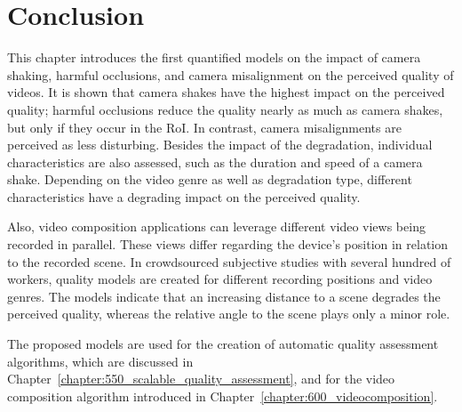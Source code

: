 \section{Conclusion}
\label{sec_499_conclusion}
This chapter introduces the first quantified models on the impact of camera shaking, harmful occlusions, and camera misalignment on the perceived quality of videos. 
It is shown that camera shakes have the highest impact on the perceived quality; harmful occlusions reduce the quality nearly as much as camera shakes, but only if they occur in the \ac{RoI}. 
In contrast, camera misalignments are perceived as less disturbing. 
Besides the impact of the degradation, individual characteristics are also assessed, such as the duration and speed of a camera shake.
Depending on the video genre as well as degradation type, different characteristics have a degrading impact on the perceived quality.

Also, video composition applications can leverage different video views being recorded in parallel.
These views differ regarding the device's position in relation to the recorded scene.
In crowdsourced subjective studies with several hundred of workers, quality models are created for different recording positions and video genres.
The models indicate that an increasing distance to a scene degrades the perceived quality, whereas the relative angle to the scene plays only a minor role.

The proposed models are used for the creation of automatic quality assessment algorithms, which are discussed in Chapter~\ref{chapter:550_scalable_quality_assessment}, and for the video composition algorithm introduced in Chapter~\ref{chapter:600_videocomposition}.
